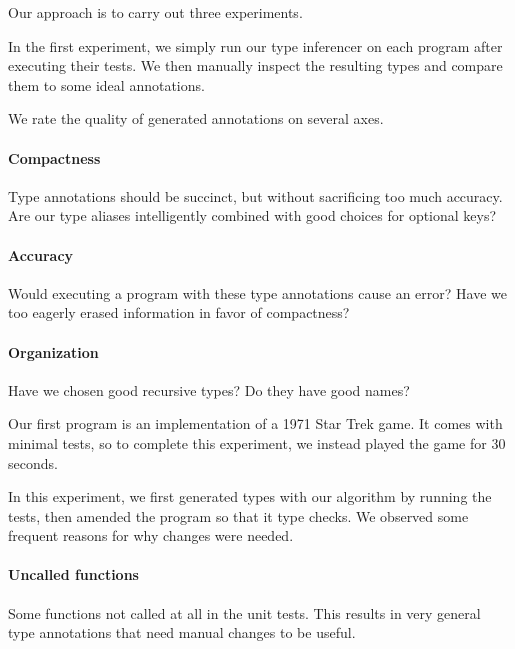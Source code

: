 Our approach is to carry out three experiments.


In the first experiment, we simply run our 
type inferencer on each program after executing
their tests.
We then manually inspect the resulting
types and compare them to some ideal
annotations.

We rate the quality of generated annotations
on several axes.

\paragraph{Compactness} Type annotations should be succinct,
        but without sacrificing too much accuracy.
        Are our type aliases intelligently combined
        with good choices for optional keys?

  \paragraph{Accuracy} Would executing a program with these
      type annotations cause an error?
      Have we too eagerly erased information in favor
      of compactness?

  \paragraph{Organization} Have we chosen good recursive types?
      Do they have good names?

Our first program is an implementation of a
1971 Star Trek game.
It comes with minimal tests, so to complete this experiment,
we instead played the game for 30 seconds.


In this experiment, we first generated types with our algorithm
by running the tests, then amended the program so that it
type checks.
We observed some frequent reasons for why changes were needed.

\paragraph{Uncalled functions}
Some functions not called at all in the unit tests.
This results in very general type annotations that need
manual changes to be useful.

